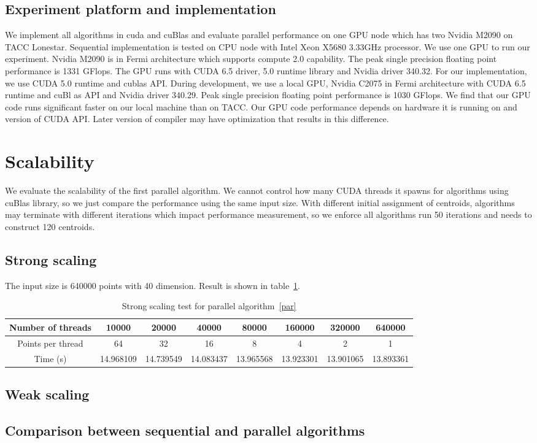 \documentclass{article}
\begin{document}
\subsection{Experiment platform and implementation}
We implement all algorithms in cuda and cuBlas and evaluate parallel performance on one GPU node which
has two Nvidia M2090 on TACC Lonestar. Sequential implementation is tested on CPU node with
Intel Xeon X5680 3.33GHz processor. We use one GPU to run our experiment. Nvidia M2090 is in Fermi
architecture which supports compute 2.0 capability. The peak single precision floating point performance
is 1331 GFlops. The GPU runs with CUDA 6.5 driver, 5.0
runtime library and Nvidia driver 340.32. For our implementation, we use CUDA 5.0 runtime and cublas API.
During development, we use a local GPU, Nvidia C2075 in Fermi architecture with CUDA 6.5 runtime and cuBl
as API and Nvidia driver 340.29. Peak single precision floating point performance is 1030 GFlops.
We find that our GPU code runs significant faster on our local machine than on TACC. Our GPU code
performance depends on hardware it is running on and version of CUDA API. Later version of compiler may
have optimization that results in this difference. 

\section{Scalability}
We evaluate the scalability of the first parallel algorithm. We cannot control how many CUDA threads it
spawns for algorithms using cuBlas library, so we just compare the performance using the same input size.
With different initial assignment of centroids, algorithms may terminate with different iterations which
impact performance measurement, so we enforce all algorithms run 50 iterations and needs to construct
120 centroids. 

\subsection{Strong scaling}
The input size is 640000 points with 40 dimension. Result is shown in table~\ref{tab:strong-scaling}. 
\begin{table}[ht]
  \centering
  \begin{tabular}{|c|c|c|c|c|c|c|c|}
    \hline
    Number of threads	& 10000	    & 20000	    & 40000	& 80000	& 160000 & 320000	& 640000 \\
    \hline
    Points per thread &	64	      & 32	      & 16	  & 8	    & 4	     & 2	    & 1 \\
    \hline
    Time (s)	   & 14.968109 &	14.739549	& 14.083437	& 13.965568	& 13.923301	& 13.901065	& 13.893361\\
    \hline
  \end{tabular}
  \label{tab:strong-scaling}
  \caption{Strong scaling test for parallel algorithm~\ref{par}}
\end{table}
 

\subsection{Weak scaling}

\subsection{Comparison between sequential and parallel algorithms}



\end{document}
